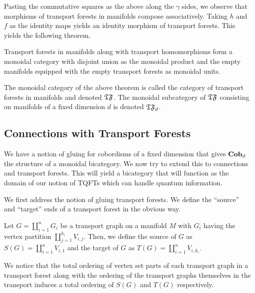 \documentclass[./Thick_TQFTs_and_Quantum_Information.tex]{subfiles}
\begin{document}
Pasting the commutative squares as the above along the $\gamma$ sides, we observe
that morphisms of transport forests in manifolds compose associatively. Taking
$h$ and $f$ as the identity maps yields an identity morphism of transport
forests. This yields the following theorem.

\begin{thm}
Transport forests in manifolds along with transport homomorphisms form a monoidal
category with disjoint union as the monoidal product and the empty manifolds
equipped with the empty transport forests as monoidal units.
\end{thm}

\begin{defn}
The monoidal category of the above theorem is called the category of transport
forests in manifolds and denoted $\mathfrak{TF}$. The monoidal subcategory of $\mathfrak{TF}$
consisting on manifolds of a fixed dimension $d$ is denoted $\mathfrak{TF}_d$.
\end{defn}

\subsection{Connections with Transport Forests}

We have a notion of gluing for cobordisms of a fixed dimension that gives
$\textbf{Cob}_d$ the structure of a monoidal bicategory. We now try to extend this to
connections and transport forests. This will yield a bicategory that will
function as the domain of our notion of TQFTs which can handle quantum
information.

We first address the notion of gluing transport forests. We define the ``source''
and ``target'' ends of a transport forest in the obvious way.
\begin{defn}
Let $G = \coprod_{i = 1}^{n} G_i$ be a transport graph on a manifold $M$ with
$G_i$ having the vertex partition $\coprod_{j = 1}^{k_i} V_{i, j}$. Then, we
define the source of $G$ as $S(G) = \coprod_{i = 1}^{n} V_{i, 1}$ and the target
of $G$ as $T(G) = \coprod_{i = 1}^{n} V_{i, k_i}$.
\end{defn}

\begin{rmk}
We notice that the total ordering of vertex set parts of each transport graph in
a transport forest along with the ordering of the transport graphs themselves in
the transport induces a total ordering of $S(G)$ and $T(G)$ respectively.
\end{rmk}
\end{document}
